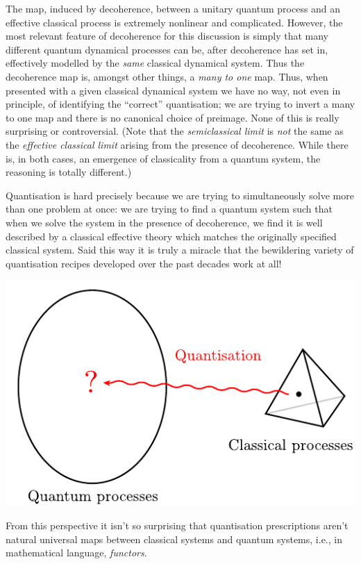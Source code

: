 \documentclass[11pt]{amsart}
\theoremstyle{plain}%
\theoremstyle{definition}
\theoremstyle{remark}
\begin{document}
The map, induced by decoherence, between a unitary quantum process and an effective classical process is extremely nonlinear and complicated. However, the most relevant feature of decoherence for this discussion is simply that many different quantum dynamical processes can be, after decoherence has set in, effectively modelled by the \emph{same} classical dynamical system. Thus the decoherence map is, amongst other things, a \emph{many to one} map. Thus, when presented with a given classical dynamical system we have no way, not even in principle, of identifying the ``correct'' quantisation; we are trying to invert a many to one map and there is no canonical choice of preimage.  None of this is really surprising or controversial. (Note that the \emph{semiclassical limit} is \emph{not} the same as the \emph{effective classical limit} arising from the presence of decoherence. While there is, in both cases, an emergence of classicality from a quantum system, the reasoning is totally different.)

Quantisation is hard precisely because we are trying to simultaneously solve more than one problem at once: we are trying to find a quantum system such that when we solve the system in the presence of decoherence, we find it is well described by a classical effective theory which matches the originally specified classical system. Said this way it is truly a miracle that the bewildering variety of quantisation recipes developed over the past decades work at all! 
\begin{center}
\includegraphics{Quantisation.pdf}
\end{center}
From this perspective it isn't so surprising that quantisation prescriptions aren't natural universal maps between classical systems and quantum systems, i.e., in mathematical language, \emph{functors}. 
\end{document}
